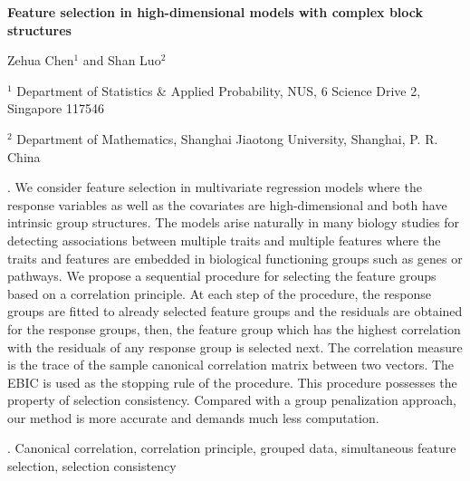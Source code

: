 \documentclass[12pt]{article}
\begin{document}
\begin{flushleft}


{\LARGE\bf Feature selection in  high-dimensional models with complex block structures}


\vspace{0.5cm}

Zehua Chen${}^1$ and Shan Luo${}^2$

\begin{description}
\item ${}^1$ Department of Statistics \& Applied Probability, NUS,
6 Science Drive 2, Singapore 117546
\item${}^2$ Department of Mathematics, 
Shanghai Jiaotong University, 
Shanghai, P. R.  China

\end{description}

\end{flushleft}


. We consider  feature selection in multivariate regression models where  the response variables as well as  the covariates are high-dimensional and both have intrinsic  group structures.  The models arise naturally in many biology studies for detecting associations between multiple traits and multiple features where the traits and features are embedded in  biological functioning groups such as genes or  pathways. We propose a sequential procedure for 
selecting the feature groups based on a correlation principle. At each step of the procedure, the response groups are fitted to already selected feature groups and the residuals are obtained for the response groups, then, the feature group which has the highest correlation with the residuals of any response group is selected next. The correlation measure is the trace of the sample canonical correlation matrix between two vectors. The EBIC 
is used as the stopping rule of the procedure. This procedure possesses the property of selection consistency. Compared with a group penalization approach, 
our method is more accurate and demands much less computation. 

\vskip 2mm

.
Canonical correlation, correlation principle, grouped data, simultaneous feature selection, selection consistency
\end{document}
